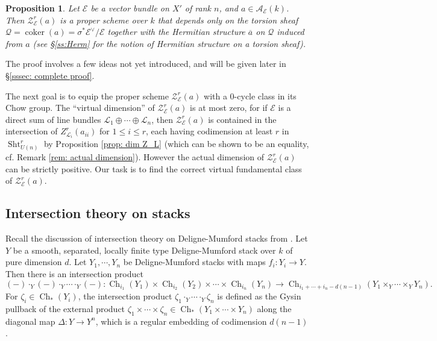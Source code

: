 \documentclass[reqno]{amsart}
\numberwithin{equation}{section}
\newcommand{\co}{\colon}
\DeclareMathOperator{\coker}{coker}
\DeclareMathOperator{\Sht}{Sht}
\DeclareMathOperator{\Ch}{Ch}
\newcommand{\ov}{\overline}
\newcommand\op{\oplus}
\newcommand{\s}{\sigma}
\newcommand{\z}{\zeta}
\newcommand\cA{\mathcal{A}}
\newcommand\cE{\mathcal{E}}
\newcommand\cL{\mathcal{L}}
\newcommand\cQ{\mathcal{Q}}
\newcommand\cZ{\mathcal{Z}}
\newtheorem{prop}[thm]{Proposition}
\theoremstyle{remark}
\numberwithin{equation}{section}
\begin{document}
\begin{prop}\label{prop: KR cycle proper} 
Let $\cE$ be a vector bundle on $X'$ of rank $n$, and $a\in \cA_{\cE}(k)$. Then $\cZ^{r}_{\cE}(a)$ is a proper scheme over $k$ that depends only on the torsion sheaf $\cQ=\coker(a)=\s^{*}\cE^{\vee}/\cE$ together with the Hermitian structure $\ov a$ on $\cQ$ induced from $a$ (see \S\ref{ss:Herm} for the notion of Hermitian structure on a torsion sheaf).
\end{prop}
The proof involves a few ideas not yet introduced, and will be given later in \S \ref{sssec: complete proof}.



The next goal is to equip the proper scheme $\cZ_{\cE}^{r}(a)$ with a $0$-cycle class in its Chow group. The ``virtual dimension'' of $\cZ_{\cE}^{r}(a)$ is at most zero, for if $\cE$ is a direct sum of line bundles $\cL_{1}\op\cdots\op \cL_{n}$, then $\cZ_{\cE}^{r}(a)$ is contained in the intersection of $Z^{r}_{\cL_{i}}(a_{ii})$ for $1\le i\le r$, each having codimension at least $r$ in $\Sht^{r}_{U(n)}$ by Proposition \ref{prop: dim Z_L} (which can be shown to be an equality, cf. Remark \ref{rem: actual dimension}).  However the actual dimension of $\cZ_{\cE}^{r}(a)$ can be strictly positive. Our task is to find the correct virtual fundamental class of $\cZ_{\cE}^{r}(a)$.


\subsection{Intersection theory on stacks}\label{ss:int stacks}
Recall the discussion of intersection theory on Deligne-Mumford stacks from \cite[Appendix A]{YZ}. Let $Y$ be a smooth, separated, locally finite type  Deligne-Mumford stack over $k$ of pure dimension $d$. Let $Y_{1}, \cdots, Y_{n}$ be Deligne-Mumford stacks with maps $f_{i}: Y_{i}\to Y$. Then there is an intersection product
\[
(-) \cdot_{Y} (-)  \cdot_Y \cdots \cdot_Y (-) \co \Ch_{i_{1}}(Y_{1}) \times \Ch_{i_{2}}(Y_{2})\times\cdots\times\Ch_{i_{n}}(Y_{n}) \rightarrow \Ch_{i_{1}+\cdots+i_{n}-d(n-1)}(Y_{1}\times_{Y}\cdots\times_{Y}Y_{n}).
\]
For $\z_{i}\in \Ch_{*}(Y_{i})$, the intersection product $\z_{1}\cdot_{Y}\cdots\cdot_{Y}\z_{n}$ is defined as the Gysin pullback of the external product $\z_{1}\times\cdots\times \z_{n}\in \Ch_{*}(Y_{1}\times\cdots\times Y_{n})$ along the diagonal map $\Delta: Y\to Y^{n}$, which is a regular embedding of codimension $d(n-1)$.
\end{document}
